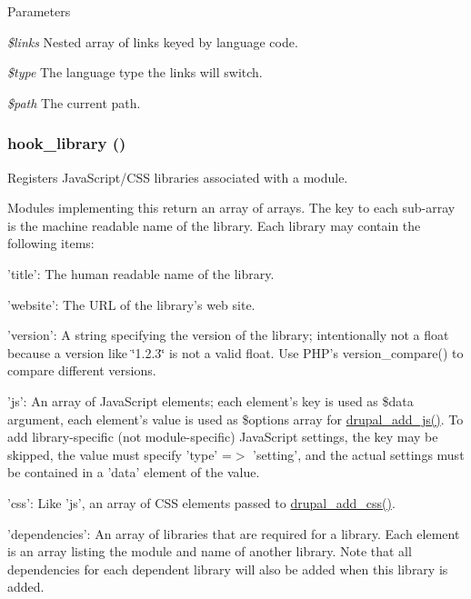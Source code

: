 \begin{DoxyParams}{Parameters}
\item[{\em \$links}]Nested array of links keyed by language code. \item[{\em \$type}]The language type the links will switch. \item[{\em \$path}]The current path. \end{DoxyParams}
\hypertarget{group__hooks_ga6bf3f83fa2e373836f5aa78fd143d1cd}{
\subsubsection[{hook\_\-library}]{\setlength{\rightskip}{0pt plus 5cm}hook\_\-library ()}}
\label{group__hooks_ga6bf3f83fa2e373836f5aa78fd143d1cd}
Registers JavaScript/CSS libraries associated with a module.

Modules implementing this return an array of arrays. The key to each sub-\/array is the machine readable name of the library. Each library may contain the following items:


\begin{DoxyItemize}
\item 'title': The human readable name of the library.
\item 'website': The URL of the library's web site.
\item 'version': A string specifying the version of the library; intentionally not a float because a version like \char`\"{}1.2.3\char`\"{} is not a valid float. Use PHP's version\_\-compare() to compare different versions.
\item 'js': An array of JavaScript elements; each element's key is used as \$data argument, each element's value is used as \$options array for \hyperlink{common_8inc_a623370a2c3c2de0390dab078d17dca02}{drupal\_\-add\_\-js()}. To add library-\/specific (not module-\/specific) JavaScript settings, the key may be skipped, the value must specify 'type' =$>$ 'setting', and the actual settings must be contained in a 'data' element of the value.
\item 'css': Like 'js', an array of CSS elements passed to \hyperlink{common_8inc_a2c5bb2667efb44b02f1a105c0bfdebe5}{drupal\_\-add\_\-css()}.
\item 'dependencies': An array of libraries that are required for a library. Each element is an array listing the module and name of another library. Note that all dependencies for each dependent library will also be added when this library is added.
\end{DoxyItemize}

